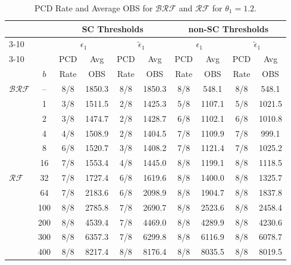\documentclass[11pt]{article}
\begin{document}
\begin{table}[h!]
\centering
\scriptsize
{\normalsize
\caption{PCD Rate and Average OBS for $\mathcal{BRF}$ and $\mathcal{RF}$ for $\theta_1=1.2$.}
\label{tab:brf_rf_sc_nonsc}
\renewcommand{\arraystretch}{0.8}
\begin{tabular}{lc||cc|cc|cc|cc}
\toprule
& &
\multicolumn{4}{c|}{SC Thresholds} &
\multicolumn{4}{c}{non-SC Thresholds} \\ \cline{3-10}
& &
\multicolumn{2}{c}{$\epsilon_1$} &
\multicolumn{2}{c|}{$\tilde{\epsilon}_1$} & \multicolumn{2}{c}{$\epsilon_1$} &
\multicolumn{2}{c}{$\tilde{\epsilon}_1$} \\ \cline{3-10}
& & PCD & Avg & PCD & Avg & PCD & Avg & PCD & Avg \\
& $b$ & Rate & OBS & Rate & OBS & Rate & OBS & Rate & OBS \\\midrule

$\mathcal{BRF}$ &  -- & 8/8 & 1850.3 & 8/8 & 1850.3 & 8/8 & 548.1 & 8/8 & 548.1 \\ \hline
\multirow{11}{*}{$\mathcal{RF}$}
& 1 & 3/8 & 1511.5 & 2/8 & 1425.3 & 5/8 & 1107.1 & 5/8 & 1021.5 \\
& 2 & 3/8 & 1474.7 & 2/8 & 1428.7 & 6/8 & 1102.1 & 6/8 & 1010.8 \\
& 4 & 4/8 & 1508.9 & 2/8 & 1404.5 & 7/8 & 1109.9 & 7/8 & 999.1 \\
& 8 & 6/8 & 1520.7 & 3/8 & 1408.2 & 7/8 & 1121.4 & 7/8 & 1025.2 \\
& 16 & 7/8 & 1553.4 & 4/8 & 1445.0 & 8/8 & 1199.1 & 8/8 & 1118.5 \\
& 32 & 7/8 & 1727.4 & 6/8 & 1619.6 & 8/8 & 1400.0 & 8/8 & 1325.7 \\
& 64 & 7/8 & 2183.6 & 6/8 & 2098.9 & 8/8 & 1904.7 & 8/8 & 1837.8 \\
& 100 & 8/8 & 2785.8 & 7/8 & 2690.7 & 8/8 & 2523.6 & 8/8 & 2458.4 \\
& 200 & 8/8 & 4539.4 & 7/8 & 4469.0 & 8/8 & 4289.9 & 8/8 & 4230.6 \\
& 300 & 8/8 & 6357.3 & 7/8 & 6299.8 & 8/8 & 6116.9 & 8/8 & 6078.7 \\
& 400 & 8/8 & 8217.4 & 8/8 & 8176.4 & 8/8 & 8035.5 & 8/8 & 8019.5 \\ 
\bottomrule
\end{tabular}}
\end{table}
\end{document}
